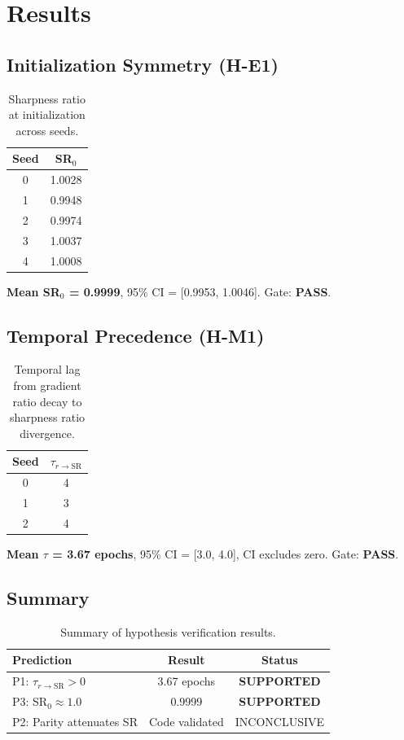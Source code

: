 \section{Results}

\subsection{Initialization Symmetry (H-E1)}

\begin{table}[h]
\centering
\begin{tabular}{cc}
\toprule
Seed & SR$_0$ \\
\midrule
0 & 1.0028 \\
1 & 0.9948 \\
2 & 0.9974 \\
3 & 1.0037 \\
4 & 1.0008 \\
\bottomrule
\end{tabular}
\caption{Sharpness ratio at initialization across seeds.}
\label{tab:sr0}
\end{table}

\textbf{Mean SR$_0$ = 0.9999}, 95\% CI = [0.9953, 1.0046]. Gate: \textbf{PASS}.

\subsection{Temporal Precedence (H-M1)}

\begin{table}[h]
\centering
\begin{tabular}{cc}
\toprule
Seed & $\tau_{r \rightarrow \text{SR}}$ \\
\midrule
0 & 4 \\
1 & 3 \\
2 & 4 \\
\bottomrule
\end{tabular}
\caption{Temporal lag from gradient ratio decay to sharpness ratio divergence.}
\label{tab:lag}
\end{table}

\textbf{Mean $\tau$ = 3.67 epochs}, 95\% CI = [3.0, 4.0], CI excludes zero. Gate: \textbf{PASS}.

\subsection{Summary}

\begin{table}[h]
\centering
\begin{tabular}{lcc}
\toprule
Prediction & Result & Status \\
\midrule
P1: $\tau_{r \rightarrow \text{SR}} > 0$ & 3.67 epochs & \textbf{SUPPORTED} \\
P3: SR$_0 \approx 1.0$ & 0.9999 & \textbf{SUPPORTED} \\
P2: Parity attenuates SR & Code validated & INCONCLUSIVE \\
\bottomrule
\end{tabular}
\caption{Summary of hypothesis verification results.}
\label{tab:summary}
\end{table}
